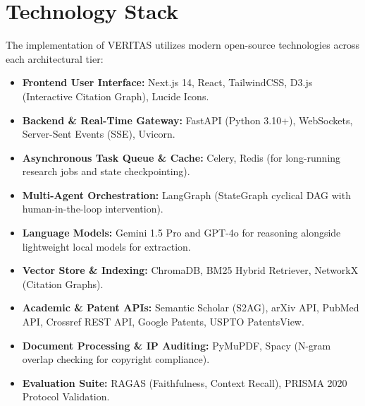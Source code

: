 \documentclass[11pt,a4paper]{article}
\begin{document}
\section{Technology Stack}
The implementation of VERITAS utilizes modern open-source technologies across each architectural tier:
\begin{itemize}[leftmargin=*,noitemsep]
    \item \textbf{Frontend User Interface:} Next.js 14, React, TailwindCSS, D3.js (Interactive Citation Graph), Lucide Icons.
    \item \textbf{Backend \& Real-Time Gateway:} FastAPI (Python 3.10+), WebSockets, Server-Sent Events (SSE), Uvicorn.
    \item \textbf{Asynchronous Task Queue \& Cache:} Celery, Redis (for long-running research jobs and state checkpointing).
    \item \textbf{Multi-Agent Orchestration:} LangGraph (StateGraph cyclical DAG with human-in-the-loop intervention).
    \item \textbf{Language Models:} Gemini 1.5 Pro and GPT-4o for reasoning alongside lightweight local models for extraction.
    \item \textbf{Vector Store \& Indexing:} ChromaDB, BM25 Hybrid Retriever, NetworkX (Citation Graphs).
    \item \textbf{Academic \& Patent APIs:} Semantic Scholar (S2AG), arXiv API, PubMed API, Crossref REST API, Google Patents, USPTO PatentsView.
    \item \textbf{Document Processing \& IP Auditing:} PyMuPDF, Spacy (N-gram overlap checking for copyright compliance).
    \item \textbf{Evaluation Suite:} RAGAS (Faithfulness, Context Recall), PRISMA 2020 Protocol Validation.
\end{itemize}

\end{document}
